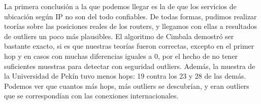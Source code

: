 La primera conclusión a la que podemos llegar es la de que los servicios
de ubicación según IP no son del todo confiables. De todas formas, pudimos 
realizar teorías sobre las posiciones reales de los routers, y llegamos con
ellas a resultados de outliers un poco más plausibles. El algoritmo de
Cimbala demostró ser bastante exacto, si es que nuestras teorías fueron
correctas, excepto en el primer hop y en casos con muchas diferencias iguales
a 0, por el hecho de no tener suficientes muestras para detectar con seguridad
outliers. Además, la muestra de la Universidad de Pekín tuvo menos hops: 19 contra
los 23 y 28 de las demás. Podemos ver que cuantos más hops, más outliers se descubrían,
y eran outliers que se correspondían con las conexiones internacionales.
